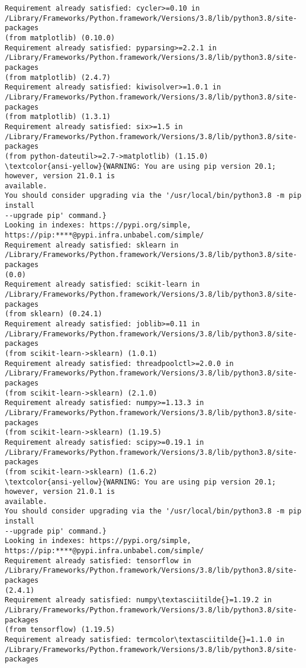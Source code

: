 \documentclass[11pt]{article}
\begin{document}
\begin{Verbatim}[commandchars=\\\{\}]
Requirement already satisfied: cycler>=0.10 in
/Library/Frameworks/Python.framework/Versions/3.8/lib/python3.8/site-packages
(from matplotlib) (0.10.0)
Requirement already satisfied: pyparsing>=2.2.1 in
/Library/Frameworks/Python.framework/Versions/3.8/lib/python3.8/site-packages
(from matplotlib) (2.4.7)
Requirement already satisfied: kiwisolver>=1.0.1 in
/Library/Frameworks/Python.framework/Versions/3.8/lib/python3.8/site-packages
(from matplotlib) (1.3.1)
Requirement already satisfied: six>=1.5 in
/Library/Frameworks/Python.framework/Versions/3.8/lib/python3.8/site-packages
(from python-dateutil>=2.7->matplotlib) (1.15.0)
\textcolor{ansi-yellow}{WARNING: You are using pip version 20.1; however, version 21.0.1 is
available.
You should consider upgrading via the '/usr/local/bin/python3.8 -m pip install
--upgrade pip' command.}
Looking in indexes: https://pypi.org/simple,
https://pip:****@pypi.infra.unbabel.com/simple/
Requirement already satisfied: sklearn in
/Library/Frameworks/Python.framework/Versions/3.8/lib/python3.8/site-packages
(0.0)
Requirement already satisfied: scikit-learn in
/Library/Frameworks/Python.framework/Versions/3.8/lib/python3.8/site-packages
(from sklearn) (0.24.1)
Requirement already satisfied: joblib>=0.11 in
/Library/Frameworks/Python.framework/Versions/3.8/lib/python3.8/site-packages
(from scikit-learn->sklearn) (1.0.1)
Requirement already satisfied: threadpoolctl>=2.0.0 in
/Library/Frameworks/Python.framework/Versions/3.8/lib/python3.8/site-packages
(from scikit-learn->sklearn) (2.1.0)
Requirement already satisfied: numpy>=1.13.3 in
/Library/Frameworks/Python.framework/Versions/3.8/lib/python3.8/site-packages
(from scikit-learn->sklearn) (1.19.5)
Requirement already satisfied: scipy>=0.19.1 in
/Library/Frameworks/Python.framework/Versions/3.8/lib/python3.8/site-packages
(from scikit-learn->sklearn) (1.6.2)
\textcolor{ansi-yellow}{WARNING: You are using pip version 20.1; however, version 21.0.1 is
available.
You should consider upgrading via the '/usr/local/bin/python3.8 -m pip install
--upgrade pip' command.}
Looking in indexes: https://pypi.org/simple,
https://pip:****@pypi.infra.unbabel.com/simple/
Requirement already satisfied: tensorflow in
/Library/Frameworks/Python.framework/Versions/3.8/lib/python3.8/site-packages
(2.4.1)
Requirement already satisfied: numpy\textasciitilde{}=1.19.2 in
/Library/Frameworks/Python.framework/Versions/3.8/lib/python3.8/site-packages
(from tensorflow) (1.19.5)
Requirement already satisfied: termcolor\textasciitilde{}=1.1.0 in
/Library/Frameworks/Python.framework/Versions/3.8/lib/python3.8/site-packages

\end{Verbatim}
\end{document}
